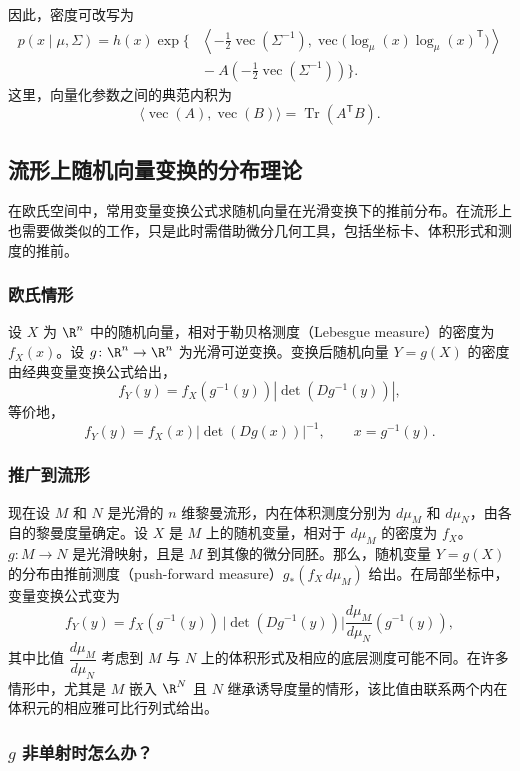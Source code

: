因此，密度可改写为
\[
  \begin{aligned}
  p(x\mid\mu,\Sigma)
    = h(x)\exp\Biggl\{
       &\left\langle-\tfrac12\operatorname{vec}(\Sigma^{-1}),
          \operatorname{vec}\bigl(\log_\mu(x)\log_\mu(x)^{\mathsf T}\bigr)\right\rangle\\
       &{}-A\left(-\tfrac12\operatorname{vec}(\Sigma^{-1})\right)
       \Biggr\}.
  \end{aligned}
\]
这里，向量化参数之间的典范内积为
\[
  \langle\operatorname{vec}(A),\operatorname{vec}(B)\rangle
  =\operatorname{Tr}(A^{\mathsf T}B).
\]

\subsection{流形上随机向量变换的分布理论}

在欧氏空间中，常用变量变换公式求随机向量在光滑变换下的推前分布。在流形上也需要做类似的工作，只是此时需借助微分几何工具，包括坐标卡、体积形式和测度的推前。

\subsubsection{欧氏情形}

设 $X$ 为 $\R^n$ 中的随机向量，相对于勒贝格测度（Lebesgue measure）的密度为 $f_X(x)$。设 $g\colon\R^n\to\R^n$ 为光滑可逆变换。变换后随机向量 $Y=g(X)$ 的密度由经典变量变换公式给出，
\[
  f_Y(y)=f_X(g^{-1}(y))\left|\det(Dg^{-1}(y))\right|,
\]
等价地，
\[
  f_Y(y)=f_X(x)\left|\det(Dg(x))\right|^{-1},\qquad x=g^{-1}(y).
\]

\subsubsection{推广到流形}

现在设 $M$ 和 $N$ 是光滑的 $n$ 维黎曼流形，内在体积测度分别为 $d\mu_M$ 和 $d\mu_N$，由各自的黎曼度量确定。设 $X$ 是 $M$ 上的随机变量，相对于 $d\mu_M$ 的密度为 $f_X$。$g\colon M\to N$ 是光滑映射，且是 $M$ 到其像的微分同胚。那么，随机变量 $Y=g(X)$ 的分布由推前测度（push-forward measure）$g_*(f_X\,d\mu_M)$ 给出。在局部坐标中，变量变换公式变为
\[
  f_Y(y)=f_X(g^{-1}(y))\,\bigl|\det(Dg^{-1}(y))\bigr|
          \frac{d\mu_M}{d\mu_N}(g^{-1}(y)),
\]
其中比值 $\dfrac{d\mu_M}{d\mu_N}$ 考虑到 $M$ 与 $N$ 上的体积形式及相应的底层测度可能不同。在许多情形中，尤其是 $M$ 嵌入 $\R^N$ 且 $N$ 继承诱导度量的情形，该比值由联系两个内在体积元的相应雅可比行列式给出。

\subsubsection{\texorpdfstring{$g$}{g} 非单射时怎么办？}

